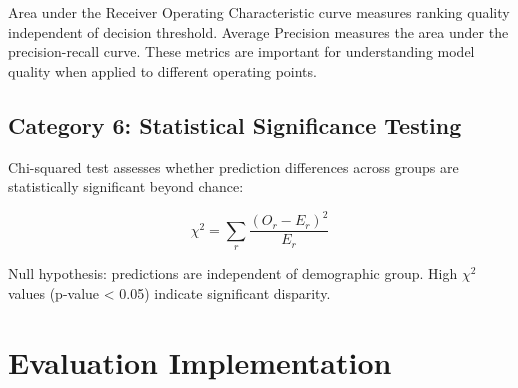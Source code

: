\documentclass[11pt,a4paper,oneside]{report}
\begin{document}
Area under the Receiver Operating Characteristic curve measures ranking quality independent of decision threshold. Average Precision measures the area under the precision-recall curve. These metrics are important for understanding model quality when applied to different operating points.

\subsection{Category 6: Statistical Significance Testing}

Chi-squared test assesses whether prediction differences across groups are statistically significant beyond chance:

\begin{equation}
\chi^2 = \sum_r \frac{(O_r - E_r)^2}{E_r}
\end{equation}

Null hypothesis: predictions are independent of demographic group. High $\chi^2$ values (p-value < 0.05) indicate significant disparity.

\section{Evaluation Implementation}
\end{document}
